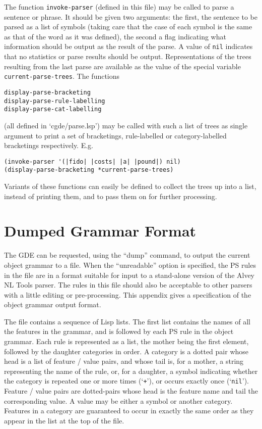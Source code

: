 The function {\tt invoke-parser} (defined in this file) may be called
to parse a sentence or phrase. It should be given two arguments: the first,
the sentence to be parsed as a list of symbols (taking care that the
case of each symbol is the same as that of the word as it was defined),
the second a flag indicating what information should be output as the
result of the parse. A value of {\tt nil} indicates that no statistics or
parse results should be output. Representations of the trees
resulting from the last parse are available as the value of the special
variable {\tt *current-parse-trees}. The functions
\begin{ex}
\begin{verbatim}
display-parse-bracketing
display-parse-rule-labelling
display-parse-cat-labelling
\end{verbatim}
\end{ex}
(all defined in `cgde/parse.lsp') may be called with such a list of trees
as single argument to print a set of bracketings, rule-labelled or
category-labelled bracketings respectively. E.g.
\begin{ex}
\begin{verbatim}
(invoke-parser '(|fido| |costs| |a| |pound|) nil)
(display-parse-bracketing *current-parse-trees)
\end{verbatim}
\end{ex}
Variants of these functions can easily be defined to collect the
trees up into a list, instead of printing them, and to pass them on for
further processing.


\chapter{Dumped Grammar Format}

The GDE can be requested, using the ``dump'' command, to output the
current object grammar to a file. When the ``unreadable'' option is
specified, the PS rules in the file are in a format suitable for input to
a stand-alone version of the Alvey NL Tools parser. The rules in this file
should also be acceptable to other parsers with a little editing or
pre-processing. This appendix gives a specification of the object
grammar output format.

The file contains a sequence of Lisp lists. The first list contains
the names of all the features in the grammar, and is followed by each PS
rule in the object grammar. Each rule is represented as a list, the mother
being the first element, followed by the daughter categories in order.
A category is a dotted pair whose head is a list of feature / value
pairs, and whose tail is, for a mother, a string representing the name
of the rule, or, for a daughter, a symbol indicating whether the
category is repeated one or more times (`{\tt +}'), or occurs
exactly once (`{\tt nil}'). Feature / value pairs are dotted-pairs whose
head is the feature name and tail the corresponding value. A value may be
either a symbol or another category. Features in a category are
guaranteed to occur in exactly the same order as they appear in the list
at the top of the file.

